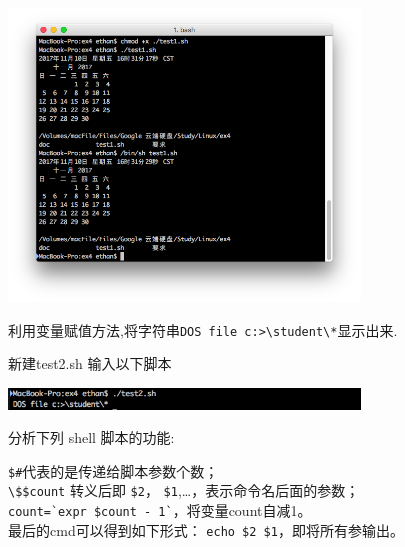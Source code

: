 \documentclass{JNUexp}
\begin{document}
\begin{image}
    \begin{center}
        \includegraphics[width=0.7\textwidth]{1}
    \end{center}
\end{image}



\begin{problem}
    利用变量赋值方法,将字符串\lstinline{DOS file c:>\student\*}显示出来.
\end{problem}

\begin{answer}
    新建test2.sh 输入以下脚本
        
\end{answer}

\begin{image}
    \begin{center}
        \includegraphics[width=0.7\textwidth]{2}
    \end{center}
\end{image}

\begin{problem}
分析下列 shell 脚本的功能:



\end{problem}

\begin{answer}
    \lstinline{$#}代表的是传递给脚本参数个数； \\
    \lstinline{\$$count} 转义后即
    \lstinline{$2}，
    \lstinline{$1},\ldots，表示命令名后面的参数；\\
    \lstinline{count=`expr $count - 1`}，将变量count自减1。\\
    最后的cmd可以得到如下形式：
    \lstinline{echo $2 $1}，即将所有参输出。
\end{answer}
\end{document}
